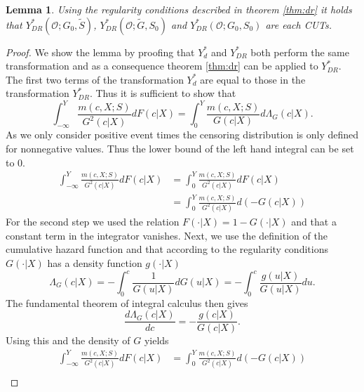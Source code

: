 \documentclass[12pt, a4paper]{scrartcl}
\theoremstyle{definition}
\theoremstyle{plain}
\newtheorem{Lemma}{Lemma}[section]
\numberwithin{equation}{section}
\numberwithin{figure}{section}
\numberwithin{table}{section}
\begin{document}
	\begin{Lemma}
		Using the regularity conditions described in theorem \ref{thm:dr} it holds that $Y_{DR}^*(\mathcal{O}; G_0, \tilde{S})$, $Y_{DR}^*(\mathcal{O}; \tilde{G}, S_0)$ and $Y_{DR}^*(\mathcal{O}; G_0, S_0)$ are each CUTs.
	\end{Lemma}
	\begin{proof}
		We show the lemma by proofing that $Y_d^*$ and $Y_{DR}^*$ both perform the same transformation and as a consequence theorem \ref{thm:dr} can be applied to $Y_{DR}^*$.
		The first two terms of the transformation $Y_d^*$ are equal to those in the transformation $Y_{DR}^*$.
		Thus it is sufficient to show that
		\begin{equation*}
		\int_{-\infty}^{Y}\frac{m(c,X;S)}{G^2(c\vert X)}dF(c\vert X) = \int_{0}^{Y} \frac{m(c,X;S)}{G(c \vert X)} d\Lambda_G(c \vert X).
		\end{equation*}
		As we only consider positive event times the censoring distribution is only defined for nonnegative values.
		Thus the lower bound of the left hand integral can be set to 0.
		\begin{equation*}
		\begin{split}
		\int_{-\infty}^{Y}\frac{m(c,X;S)}{G^2(c\vert X)}dF(c\vert X) &= \int_{0}^{Y}\frac{m(c,X;S)}{G^2(c\vert X)}dF(c\vert X)\\
		&= \int_{0}^{Y}\frac{m(c,X;S)}{G^2(c\vert X)}d(-G(c\vert X))
		\end{split}
		\end{equation*}
		For the second step we used the relation $F(\cdot\vert X)= 1-G(\cdot\vert X)$ and that a constant term in the integrator vanishes.
		Next, we use the definition of the cumulative hazard function and that according to the regularity conditions $G(\cdot \vert X)$ has a density function $g(\cdot \vert X)$
		\begin{equation*}
			\Lambda_G(c \vert X) = - \int_{0}^{c}\frac{1}{G(u\vert X)}dG(u\vert X) = - \int_{0}^{c}\frac{g(u\vert X)}{G(u\vert X)}du.
		\end{equation*}
		The fundamental theorem of integral calculus
		then gives
		\begin{equation*}
		\frac{d\Lambda_G(c \vert X)}{dc} = -\frac{g(c\vert X)}{G(c\vert X)}.
		\end{equation*}
		Using this and the density of $G$ yields
		\begin{equation*}
		\begin{split}
		\int_{-\infty}^{Y}\frac{m(c,X;S)}{G^2(c\vert X)}dF(c\vert X) &= \int_{0}^{Y}\frac{m(c,X;S)}{G^2(c\vert X)}d(-G(c\vert X))\\

\end{split}
\end{equation*}
\end{proof}
\end{document}
